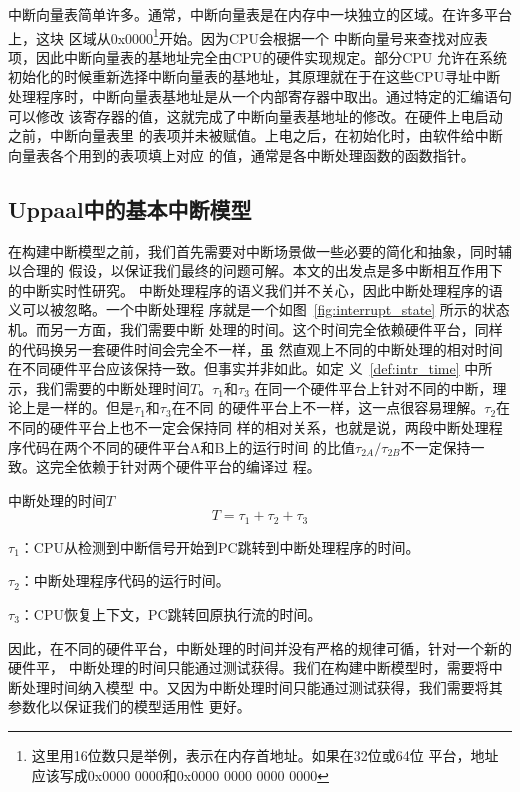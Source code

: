 中断向量表简单许多。通常，中断向量表是在内存中一块独立的区域。在许多平台上，这块
区域从0x0000\footnote{这里用16位数只是举例，表示在内存首地址。如果在32位或64位
平台，地址应该写成0x0000 0000和0x0000 0000 0000 0000}开始。因为CPU会根据一个
中断向量号来查找对应表项，因此中断向量表的基地址完全由CPU的硬件实现规定。部分CPU
允许在系统初始化的时候重新选择中断向量表的基地址，其原理就在于在这些CPU寻址中断
处理程序时，中断向量表基地址是从一个内部寄存器中取出。通过特定的汇编语句可以修改
该寄存器的值，这就完成了中断向量表基地址的修改。在硬件上电启动之前，中断向量表里
的表项并未被赋值。上电之后，在初始化时，由软件给中断向量表各个用到的表项填上对应
的值，通常是各中断处理函数的函数指针。

\subsection{Uppaal中的基本中断模型}
\label{subsec:basic_uppaal}

在构建中断模型之前，我们首先需要对中断场景做一些必要的简化和抽象，同时辅以合理的
假设，以保证我们最终的问题可解。本文的出发点是多中断相互作用下的中断实时性研究。
中断处理程序的语义我们并不关心，因此中断处理程序的语义可以被忽略。一个中断处理程
序就是一个如图~\ref{fig:interrupt_state} 所示的状态机。而另一方面，我们需要中断
处理的时间。这个时间完全依赖硬件平台，同样的代码换另一套硬件时间会完全不一样，虽
然直观上不同的中断处理的相对时间在不同硬件平台应该保持一致。但事实并非如此。如定
义~\ref{def:intr_time} 中所示，我们需要的中断处理时间$T$。$\tau_1$和$\tau_3$
在同一个硬件平台上针对不同的中断，理论上是一样的。但是$\tau_1$和$\tau_3$在不同
的硬件平台上不一样，这一点很容易理解。$\tau_2$在不同的硬件平台上也不一定会保持同
样的相对关系，也就是说，两段中断处理程序代码在两个不同的硬件平台A和B上的运行时间
的比值$\tau_{2A}/\tau_{2B}$不一定保持一致。这完全依赖于针对两个硬件平台的编译过
程。

\begin{definition}
	中断处理的时间$T$
	\label{def:intr_time}
	\begin{equation}
		T = \tau_1 + \tau_2 + \tau_3
	\end{equation}
	
	$\tau_1$：CPU从检测到中断信号开始到PC跳转到中断处理程序的时间。
	
	$\tau_2$：中断处理程序代码的运行时间。
	
	$\tau_3$：CPU恢复上下文，PC跳转回原执行流的时间。
\end{definition}

因此，在不同的硬件平台，中断处理的时间并没有严格的规律可循，针对一个新的硬件平，
中断处理的时间只能通过测试获得。我们在构建中断模型时，需要将中断处理时间纳入模型
中。又因为中断处理时间只能通过测试获得，我们需要将其参数化以保证我们的模型适用性
更好。


